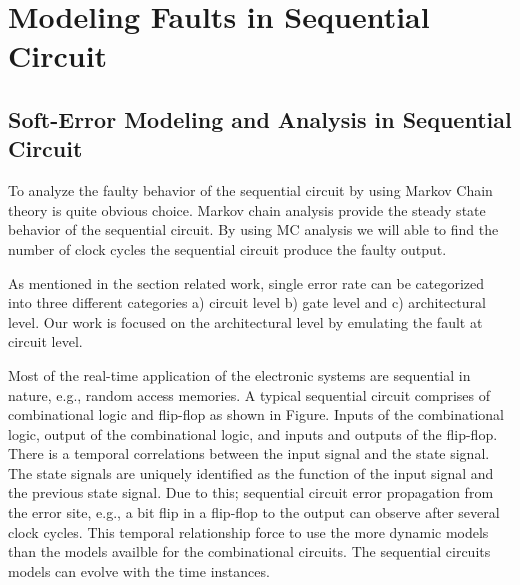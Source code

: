

\section{Modeling Faults in Sequential Circuit}
\subsection{Soft-Error Modeling and Analysis in Sequential Circuit}


To analyze the faulty behavior of the sequential circuit by using Markov Chain theory is quite obvious choice. Markov chain analysis provide the steady state behavior of the sequential circuit. By using MC analysis we will able to find the number of clock cycles the sequential circuit produce the faulty output.

As mentioned in the section related work, single error rate can be categorized into three different categories a)  circuit level b) gate level and c) architectural level.  Our work is focused on the architectural level by emulating the fault at circuit level. 




Most of the real-time application of the electronic systems are sequential in nature, e.g., random access memories. A typical sequential circuit comprises of combinational logic and flip-flop as shown in Figure.   Inputs of the combinational logic, output of the combinational logic, and inputs and outputs of the flip-flop. There is a temporal correlations between the input signal and the state signal. The state signals are uniquely identified as the function of the input signal and the previous state signal. Due to this; sequential circuit error propagation from the error site, e.g., a bit flip in a flip-flop to the output can observe after several clock cycles. This temporal relationship force to use the more dynamic models than the models availble for the combinational circuits. The sequential circuits models can evolve with the time instances.

